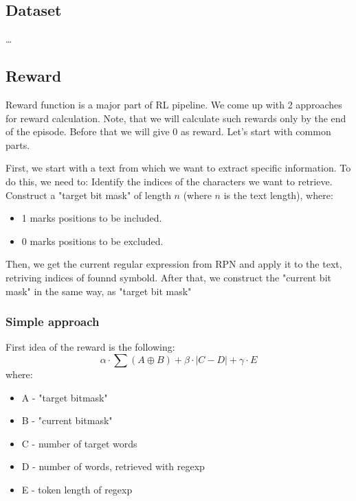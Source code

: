 \documentclass{article}
\begin{document}
\subsection{Dataset}
\dots

\subsection{Reward}
Reward function is a major part of RL pipeline. We come up with 2 approaches for reward calculation. 
Note, that we will calculate such rewards only by the end of the episode. Before that we will give 0 as reward.
Let's start with common parts.

First, we start with a text from which we want to extract specific information. To do this, we need to:
Identify the indices of the characters we want to retrieve.
Construct a "target bit mask" of length $n$ (where $n$ is the text length), where:
\begin{itemize}
  \item 1 marks positions to be included.
  \item 0 marks positions to be excluded.
\end{itemize}

Then, we get the current regular expression from RPN and apply it to the text, retriving indices of founnd symbold.
After that, we construct the "current bit mask" in the same way, as "target bit mask"

\subsubsection{Simple approach}
First idea of the reward is the following:
$$
\alpha \cdot \sum(A \oplus B) + \beta \cdot |C - D| + \gamma \cdot E
$$
where:
\begin{itemize}
  \item A - "target bitmask"
  \item B - "current bitmask"
  \item C - number of target words
  \item D - number of words, retrieved with regexp
  \item E - token length of regexp
\end{itemize}
\end{document}
